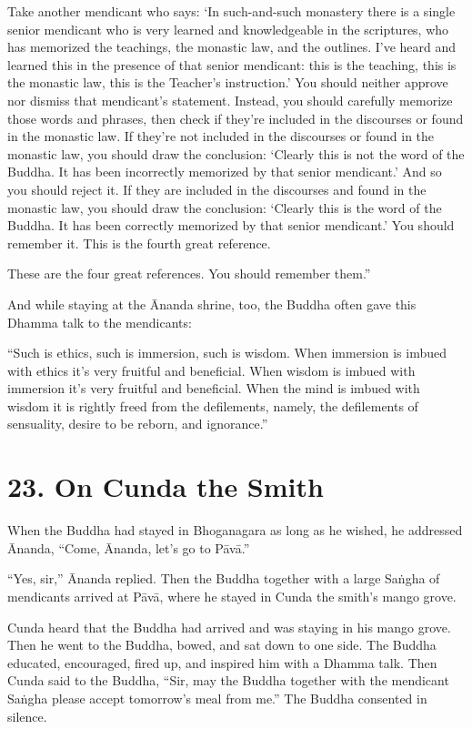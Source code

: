 \documentclass[12pt,openany]{book}%
\begin{document}
Take another mendicant who says: ‘In such-and-such monastery there is a single senior mendicant who is very learned and knowledgeable in the scriptures, who has memorized the teachings, the monastic law, and the outlines. I’ve heard and learned this in the presence of that senior mendicant: this is the teaching, this is the monastic law, this is the Teacher’s instruction.’ You should neither approve nor dismiss that mendicant’s statement. Instead, you should carefully memorize those words and phrases, then check if they’re included in the discourses or found in the monastic law. If they’re not included in the discourses or found in the monastic law, you should draw the conclusion: ‘Clearly this is not the word of the Buddha. It has been incorrectly memorized by that senior mendicant.’ And so you should reject it. If they are included in the discourses and found in the monastic law, you should draw the conclusion: ‘Clearly this is the word of the Buddha. It has been correctly memorized by that senior mendicant.’ You should remember it. This is the fourth great reference. 

These are the four great references. You should remember them.” 

And while staying at the Ānanda shrine, too, the Buddha often gave this Dhamma talk to the mendicants: 

“Such is ethics, such is immersion, such is wisdom. When immersion is imbued with ethics it’s very fruitful and beneficial. When wisdom is imbued with immersion it’s very fruitful and beneficial. When the mind is imbued with wisdom it is rightly freed from the defilements, namely, the defilements of sensuality, desire to be reborn, and ignorance.” 

\section*{23. On Cunda the Smith }

When the Buddha had stayed in Bhoganagara as long as he wished, he addressed Ānanda, “Come, Ānanda, let’s go to \textsanskrit{Pāvā}.” 

“Yes, sir,” Ānanda replied. Then the Buddha together with a large \textsanskrit{Saṅgha} of mendicants arrived at \textsanskrit{Pāvā}, where he stayed in Cunda the smith’s mango grove. 

Cunda heard that the Buddha had arrived and was staying in his mango grove. Then he went to the Buddha, bowed, and sat down to one side. The Buddha educated, encouraged, fired up, and inspired him with a Dhamma talk. Then Cunda said to the Buddha, “Sir, may the Buddha together with the mendicant \textsanskrit{Saṅgha} please accept tomorrow’s meal from me.” The Buddha consented in silence. 
\end{document}
